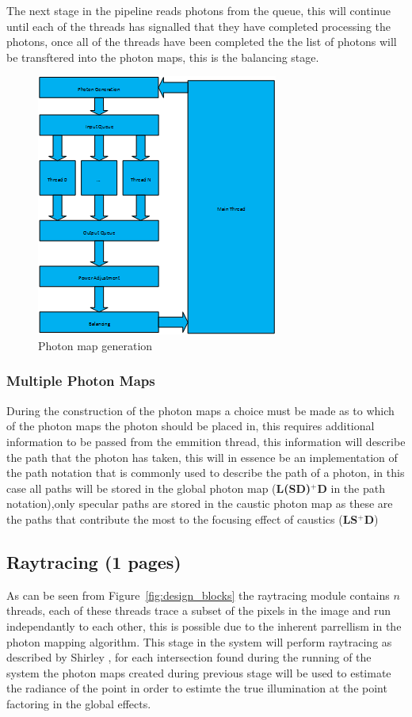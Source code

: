 The next stage in the pipeline reads photons from the queue, this will continue until each of the threads
has signalled that they have completed processing the photons, once all of the threads have been completed the
the list of photons will be transftered into the photon maps, this is the balancing stage.

\begin{figure}
\centering
\includegraphics{./images/photon_threading.png}
\caption{Photon map generation}
\label{fig:photon_generation}
\end{figure}

\subsubsection{Multiple Photon Maps}
During the construction of the photon maps a choice must be made as to which of the photon maps the photon
should be placed in, this requires additional information to be passed from the emmition thread, this information
will describe the path that the photon has taken, this will in essence be an implementation of the path notation
that is commonly used to describe the path of a photon, in this case all paths will be stored in the global photon
map (\textbf{L(S\textbar D)$^+$D} in the path notation),only specular paths are stored in the caustic photon map
as these are the paths that contribute the most to the focusing effect of caustics (\textbf{LS$^+$D})


\subsection{Raytracing (1 pages)}
As can be seen from Figure~\ref{fig:design_blocks} the raytracing module contains $n$ threads, each of these
threads trace a subset of the pixels in the image and run independantly to each other, this is possible due
to the inherent parrellism in the photon mapping algorithm. This stage in the system will perform raytracing
as described by Shirley \cite{shirley-dist}, for each intersection found during the running of the system the photon
maps created during previous stage will be used to estimate the radiance of the point in order to estimte the
true illumination at the point factoring in the global effects.

